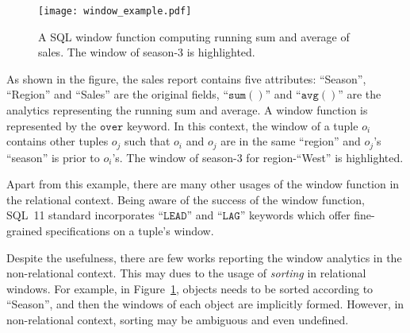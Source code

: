 \begin{figure}[h]
\centering
\texttt{[image: window\_example.pdf]}
\caption{A SQL window function computing running sum and average of
sales. The window of season-3 is highlighted.} 
\label{fig:window}
\end{figure}

As shown in the figure, the sales report contains five attributes: 
``Season'', ``Region'' and ``Sales'' are the original fields, ``$\mathtt{sum()}$'' and ``$\mathtt{avg()}$''
are the analytics representing the running sum and average. A window function
is represented by the $\mathtt{over}$ keyword. In this context, the window of a tuple $o_i$
contains other tuples $o_j$ such that $o_i$ and $o_j$ are in the same ``region'' and $o_j$'s ``season'' is
prior to $o_i$'s. The window of season-$3$ for region-``West'' is highlighted.

Apart from this example, there are many other 
usages of the window function in the relational context. 
Being aware of the success of the window function, 
SQL~11 standard incorporates ``$\mathtt{LEAD}$'' and ``$\mathtt{LAG}$'' 
keywords which offer fine-grained specifications on a tuple's window.

Despite the usefulness, there are few works reporting the window
analytics in the non-relational context. This may dues to the
usage of \emph{sorting} in relational windows. For example,
in Figure~\ref{fig:window},
objects needs to be sorted according to ``Season'', and then the windows of
each object are implicitly formed. However, 
in non-relational context, sorting may be ambiguous and even undefined.

